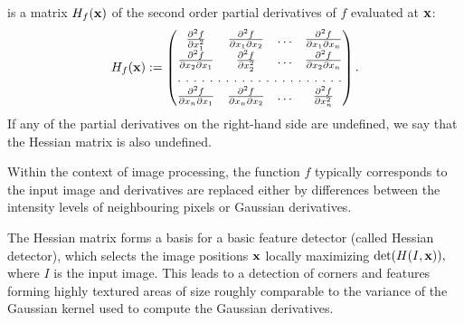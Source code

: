 \begin{definition} 
 is a matrix $H_f(\mathbf{x})$ of the second order partial derivatives of $f$ evaluated at $\mathbf{x}$: %
\begin{align*} 
H_f(\x) := 
\begin{pmatrix} 
\fpp{ \partial x_1^2 }              &   \fpp{ \partial x_1 \partial x_2 }   &   \ldots   &   \fpp{ \partial x_1 \partial x_n }   \\ 
\fpp{ \partial x_2 \partial x_1 }   &   \fpp{ \partial x_2^2 }              &   \ldots   &   \fpp{ \partial x_2 \partial x_n }   \\ 
\hdotsfor[2]{4} \\ 
\fpp{ \partial x_n \partial x_1 }   &   \fpp{ \partial x_n \partial x_2 }   &   \ldots   &   \fpp{ \partial x_n^2 }  
\end{pmatrix}. 
\end{align*} 
If any of the partial derivatives on the right-hand side are undefined, we say that the Hessian matrix is also undefined.
% 
\end{definition} 
Within the context of image processing, the function $f$ typically corresponds to the input image and derivatives are replaced either by differences between the intensity levels of neighbouring pixels or Gaussian derivatives. 

The Hessian matrix forms a basis for a basic feature detector (called Hessian detector), which selects the image positions $\mathbf{x}$ locally maximizing $\det(H(I, \mathbf{x})),$ where $I$ is the input image.
This leads to a detection of corners and features forming highly textured areas of size roughly comparable to the variance of the Gaussian kernel used to compute the Gaussian derivatives. %

